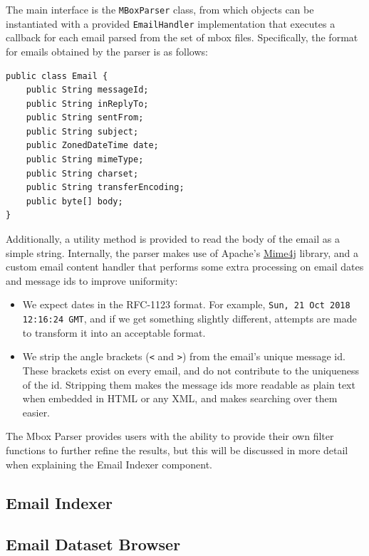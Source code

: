 \documentclass[a4paper, 12pt]{article}
\begin{document}
		The main interface is the \texttt{MBoxParser} class, from which objects can be instantiated with a provided \texttt{EmailHandler} implementation that executes a callback for each email parsed from the set of mbox files. Specifically, the format for emails obtained by the parser is as follows:
		
		\begin{verbatim}
public class Email {
	public String messageId;
	public String inReplyTo;
	public String sentFrom;
	public String subject;
	public ZonedDateTime date;
	public String mimeType;
	public String charset;
	public String transferEncoding;
	public byte[] body;
}
		\end{verbatim}
	
		Additionally, a utility method is provided to read the body of the email as a simple string. Internally, the parser makes use of Apache's \href{https://james.apache.org/mime4j/}{Mime4j} library, and a custom email content handler that performs some extra processing on email dates and message ids to improve uniformity:
		
		\begin{itemize}
			\item We expect dates in the RFC-1123 format. For example, \texttt{Sun, 21 Oct 2018 12:16:24 GMT}, and if we get something slightly different, attempts are made to transform it into an acceptable format.
			\item We strip the angle brackets (\texttt{<} and \texttt{>}) from the email's unique message id. These brackets exist on every email, and do not contribute to the uniqueness of the id. Stripping them makes the message ids more readable as plain text when embedded in HTML or any XML, and makes searching over them easier.
		\end{itemize}

		The Mbox Parser provides users with the ability to provide their own filter functions to further refine the results, but this will be discussed in more detail when explaining the Email Indexer component.
	
	\subsection{Email Indexer}
	
	\subsection{Email Dataset Browser}
		\label{sec:email-dataset-browser}
	
\end{document}
